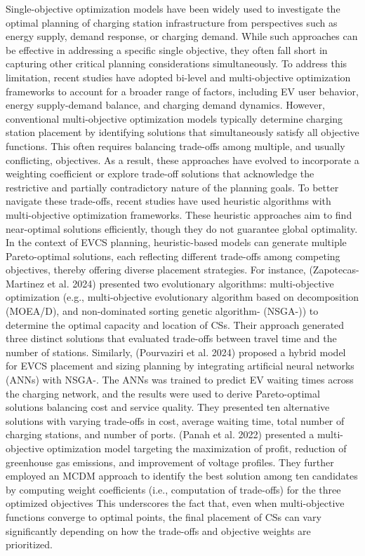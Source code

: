 \documentclass[preprint,12pt]{elsarticle}
\begin{document}
Single-objective optimization models have been widely used to investigate the optimal planning of charging station infrastructure from perspectives such as energy supply, demand response, or charging demand. While such approaches can be effective in addressing a specific single objective, they often fall short in capturing other critical planning considerations simultaneously. To address this limitation, recent studies have adopted bi-level and multi-objective optimization frameworks to account for a broader range of factors, including EV user behavior, energy supply-demand balance, and charging demand dynamics. However, conventional multi-objective optimization models typically determine charging station placement by identifying solutions that simultaneously satisfy all objective functions. This often requires balancing trade-offs among multiple, and usually conflicting, objectives. As a result, these approaches have evolved to incorporate a weighting coefficient or explore trade-off solutions that acknowledge the restrictive and partially contradictory nature of the planning goals. To better navigate these trade-offs, recent studies have used heuristic algorithms with multi-objective optimization frameworks. These heuristic approaches aim to find near-optimal solutions efficiently, though they do not guarantee global optimality. In the context of EVCS planning, heuristic-based models can generate multiple Pareto-optimal solutions, each reflecting different trade-offs among competing objectives, thereby offering diverse placement strategies. For instance, (Zapotecas-Martinez et al. 2024) \cite{zapot2024} presented two evolutionary algorithms: multi-objective optimization (e.g., multi-objective evolutionary algorithm based on decomposition (MOEA/D), and non-dominated sorting genetic algorithm- (NSGA-)) to determine the optimal capacity and location of CSs. Their approach generated three distinct solutions that evaluated trade-offs between travel time and the number of stations. Similarly, (Pourvaziri et al. 2024) \cite{Pourvaziri2024} proposed a hybrid model for EVCS placement and sizing planning by integrating artificial neural networks (ANNs) with NSGA-. The ANNs was trained to predict EV waiting times across the charging network, and the results were used to derive Pareto-optimal solutions balancing cost and service quality. They presented ten alternative solutions with varying trade-offs in cost, average waiting time, total number of charging stations, and number of ports. (Panah et al. 2022) \cite{Panah2022} presented a multi-objective optimization model targeting the maximization of profit, reduction of greenhouse gas emissions, and improvement of voltage profiles. They further employed an MCDM approach to identify the best solution among ten candidates by computing weight coefficients (i.e., computation of trade-offs) for the three optimized objectives This underscores the fact that, even when multi-objective functions converge to optimal points, the final placement of CSs can vary significantly depending on how the trade-offs and objective weights are prioritized.
\end{document}
